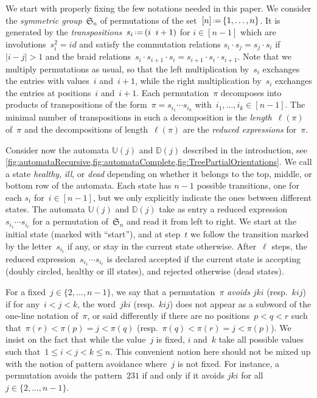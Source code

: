 \documentclass{amsart}
\newcommand{\fS}{\mathfrak{S}} %
\newcommand{\eqdef}{\mbox{\,\raisebox{0.2ex}{\scriptsize\ensuremath{\mathrm:}}\ensuremath{=}\,}} %
\newcommand{\defn}[1]{\textsl{\color{darkblue} #1}} %
\newcommand{\automatonU}{\mathbb{U}} %
\newcommand{\automatonD}{\mathbb{D}} %
\begin{document}
We start with properly fixing the few notations needed in this paper.
We consider the \defn{symmetric group}~$\fS_n$ of permutations of the set~$[n] \eqdef \{1,\dots,n\}$.
It is generated by the \defn{transpositions}~$s_i \eqdef (i \;\; i+1)$ for $i \in [n-1]$ which are involutions~$s_i^2 = id$ and satisfy the commutation relations $s_i \cdot s_j =s_j \cdot s_i$ if $|i-j|>1$ and the braid relations~$s_i \cdot s_{i+1} \cdot s_i = s_{i+1} \cdot s_i \cdot s_{i+1}$.
Note that we multiply permutations as usual, so that the left multiplication by~$s_i$ exchanges the entries with values~$i$ and~$i+1$, while the right multiplication by~$s_i$ exchanges the entries at positions~$i$ and~$i+1$.
Each permutation~$\pi$ decomposes into products of transpositions of the form~$\pi = s_{i_1} \cdots s_{i_k}$ with~$i_1, \dots, i_k \in [n-1]$.
The minimal number of transpositions in such a decomposition is the \defn{length}~$\ell(\pi)$ of~$\pi$ and the decompositions of length~$\ell(\pi)$ are the \defn{reduced expressions} for~$\pi$.

Consider now the automata $\automatonU(j)$ and $\automatonD(j)$ described in the introduction, see \cref{fig:automataRecursive,fig:automataComplete,fig:TreePartialOrientations}.
We call a state \defn{healthy}, \defn{ill}, or \defn{dead} depending on whether it belongs to the top, middle, or bottom row of the automata.
Each state has $n-1$ possible transitions, one for each $s_i$ for~$i \in [n-1]$, but we only explicitly indicate the ones between different states.
The automata $\automatonU(j)$ and $\automatonD(j)$ take as entry a reduced expression~$s_{i_1} \cdots s_{i_\ell}$ for a permutation of~$\fS_n$ and read it from left to right.
We start at the initial state (marked with ``start''), and at step~$t$ we follow the transition marked by the letter~$s_{i_t}$ if any, or stay in the current state otherwise.
After~$\ell$ steps, the reduced expression~$s_{i_1} \cdots s_{i_\ell}$ is declared accepted if the current state is accepting (doubly circled, healthy or ill states), and rejected otherwise (dead states).

For a fixed~$j \in \{2, \dots, n-1\}$, we say that a permutation~$\pi$ \defn{avoids} $jki$ (resp.~$kij$) if for any~$i < j < k$, the word~$jki$ (resp.~$kij$) does not appear as a subword of the one-line notation of~$\pi$, or said differently if there are no positions~$p < q < r$ such that~$\pi(r) < \pi(p) = j < \pi(q)$ (resp.~$\pi(q) < \pi(r) = j < \pi(p)$).
We insist on the fact that while the value~$j$ is fixed, $i$ and~$k$ take all possible values such that~$1 \le i < j < k \le n$.
This convenient notion here should not be mixed up with the notion of pattern avoidance where~$j$ is not fixed.
For instance, a permutation avoids the pattern~$231$ if and only if it avoids $jki$ for all~$j \in \{2, \dots, n-1\}$.
\end{document}
